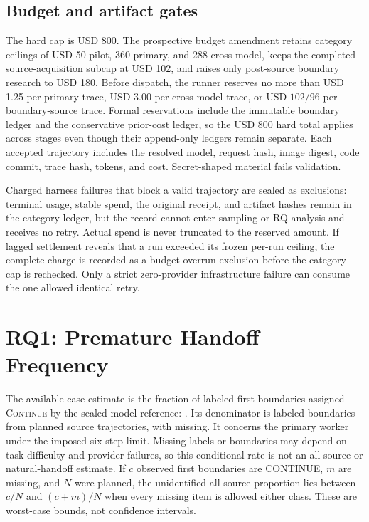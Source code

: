 \documentclass[sigconf,nonacm]{acmart}
\newcommand{\continueaction}{\textsc{Continue}}
\begin{document}
\subsection{Budget and artifact gates}

The hard cap is USD 800. The prospective budget amendment retains category ceilings of USD 50 pilot, 360 primary, and 288 cross-model, keeps the completed source-acquisition subcap at USD 102, and raises only post-source boundary research to USD 180. Before dispatch, the runner reserves no more than USD 1.25 per primary trace, USD 3.00 per cross-model trace, or USD $102/96$ per boundary-source trace. Formal reservations include the immutable boundary ledger and the conservative prior-cost ledger, so the USD 800 hard total applies across stages even though their append-only ledgers remain separate. Each accepted trajectory includes the resolved model, request hash, image digest, code commit, trace hash, tokens, and cost. Secret-shaped material fails validation.

Charged harness failures that block a valid trajectory are sealed as exclusions: terminal usage, stable spend, the original receipt, and artifact hashes remain in the category ledger, but the record cannot enter sampling or RQ analysis and receives no retry. Actual spend is never truncated to the reserved amount. If lagged settlement reveals that a run exceeded its frozen per-run ceiling, the complete charge is recorded as a budget-overrun exclusion before the category cap is rechecked. Only a strict zero-provider infrastructure failure can consume the one allowed identical retry.

\section{RQ1: Premature Handoff Frequency}

The available-case estimate is the fraction of labeled first boundaries assigned \continueaction{} by the sealed model reference: \PrematureFrequency{}. Its denominator is \PrematureLabeledCount{} labeled boundaries from \PrematureSourceCount{} planned source trajectories, with \PrematureMissingCount{} missing. It concerns the primary worker under the imposed six-step limit. Missing labels or boundaries may depend on task difficulty and provider failures, so this conditional rate is not an all-source or natural-handoff estimate. If $c$ observed first boundaries are CONTINUE, $m$ are missing, and $N$ were planned, the unidentified all-source proportion lies between $c/N$ and $(c+m)/N$ when every missing item is allowed either class. These are worst-case bounds, not confidence intervals.
\end{document}
